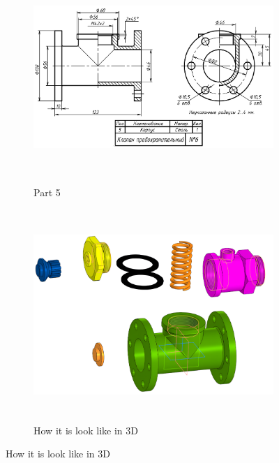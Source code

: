 \documentclass[12pt]{article}
\begin{document}
\begin{figure}[H]

    \begin{subfigure}[c]{0.59\textwidth}
        \centering\includegraphics[height=8cm,width=1\textwidth,keepaspectratio]{resources_CAD/global_var1/t5.png}
        \caption{Part 5}
        \label{fig:resources_CAD/global_var1/t5.png}
    \end{subfigure}
    \begin{subfigure}[c]{0.39\textwidth}
        \centering\includegraphics[height=8cm,width=1\textwidth,keepaspectratio]{resources_CAD/global_var1/h1.png}
        \caption{How it is look like in 3D}
        \label{fig:resources_CAD/global_var1/h1.png}
    \end{subfigure}


\end{figure}
\end{document}
